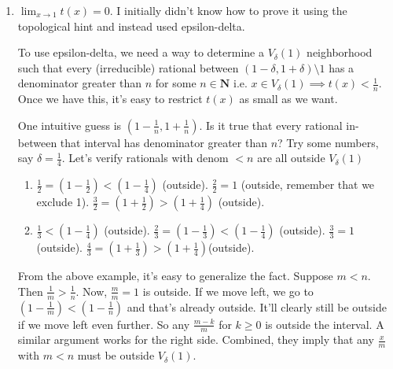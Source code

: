 \documentclass{oxmathproblems}
\begin{document}
\begin{questions}
\begin{solution}
\begin{enumerate}[label=(\alph*)]
    If $p \mid n$, then $(n^3+n+1) \mod p = 1$, contradicting the fact that $p$ divides the nume. If $p \mid (n+1)$, then
    $(n^3 + (n+1)) \mod p = n^3 + 0 \mod p$. Since $p \mid (n+1) \implies n \mod p = -1$, we have $n^3 \mod p = (-1)^3 = -1$.
    So $(n^3 + (n+1)) \mod p = -1 + 0 \mod p = -1$, again contradicting the fact that $p$ divides the nume.

    Then $t(z_{n}) = (\frac{1}{n^{3}+n^{2}})$ and $\lim t(z_{n}) = 0$.


    -------------------------------------\\
    Alternatively, we can choose an easier $(z_{n})$ like $\frac{2n+1}{2n}$ or $\frac{n^{2}+1}{n^{2}}$ that makes it instantly obvious that they're irreducible,
    avoiding the number theory mess.

    \item $\lim_{x \to 1}t(x) = 0$.  I initially didn't know how to prove it using the topological hint and instead used epsilon-delta.
    
    To use epsilon-delta, we need a way to determine a $V_{\delta}(1)$ neighborhood such that every (irreducible) rational between $(1-\delta, 1+\delta) \setminus 1$
    has a denominator greater than $n$ for some $n \in \textbf{N}$ i.e. $x \in V_{\delta}(1) \implies t(x) < \frac{1}{n}$. 
    Once we have this, it's easy to restrict $t(x)$ as small as we want.

    One intuitive guess is $(1-\frac{1}{n}, 1+\frac{1}{n})$. Is it true that every rational in-between that interval has denominator greater than $n$? Try some numbers,
    say $\delta = \frac{1}{4}$. Let's verify rationals with denom $< n$ are all outside $V_{\delta}(1)$
    \begin{enumerate}
      \item $\frac{1}{2}=(1-\frac{1}{2}) < (1-\frac{1}{4})$ (outside). $\frac{2}{2} = 1$ (outside, remember that we exclude 1). $\frac{3}{2} = (1+\frac{1}{2}) > (1+\frac{1}{4})$ (outside).
      \item $\frac{1}{3} < (1-\frac{1}{4})$ (outside). $\frac{2}{3}=(1-\frac{1}{3}) < (1-\frac{1}{4})$ (outside). $\frac{3}{3} = 1$ (outside). $\frac{4}{3} = (1+\frac{1}{3}) > (1+\frac{1}{4})$(outside).
    \end{enumerate}

    From the above example, it's easy to generalize the fact. Suppose $m < n$. Then $\frac{1}{m} > \frac{1}{n}$. Now, $\frac{m}{m}=1$ is outside. If we move left, we go to $(1-\frac{1}{m}) < (1-\frac{1}{n})$
    and that's already outside. It'll clearly still be outside if we move left even further. So any $\frac{m-k}{m}$ for $k \geq 0$ is outside the interval. A similar argument works for the right side.
    Combined, they imply that any $\frac{x}{m}$ with $m < n$ must be outside $V_{\delta}(1)$.


\end{enumerate}
\end{solution}
\end{questions}
\end{document}
